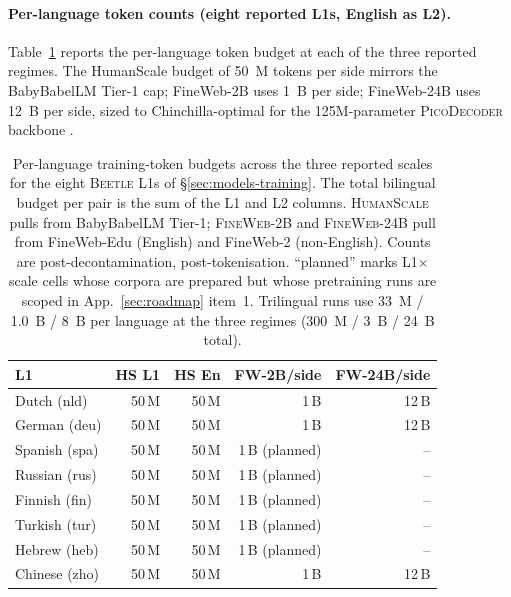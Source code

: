 \paragraph{Per-language token counts (eight reported L1s, English as L2).} Table~\ref{tab:beetle-data-tokens} reports the per-language token budget at each of the three reported regimes. The HumanScale budget of 50~M tokens per side mirrors the BabyBabelLM Tier-1 cap; FineWeb-2B uses 1~B per side; FineWeb-24B uses 12~B per side, sized to Chinchilla-optimal for the 125M-parameter \textsc{PicoDecoder} backbone \citep{hoffmann2022}.

\begin{table}[!ht]
\centering
\small
\caption{Per-language training-token budgets across the three reported scales for the eight \textsc{Beetle} L1s of \S\ref{sec:models-training}. The total bilingual budget per pair is the sum of the L1 and L2 columns. \textsc{HumanScale} pulls from BabyBabelLM Tier-1; \textsc{FineWeb-2B} and \textsc{FineWeb-24B} pull from FineWeb-Edu (English) and FineWeb-2 (non-English). Counts are post-decontamination, post-tokenisation. ``planned'' marks L1$\times$scale cells whose corpora are prepared but whose pretraining runs are scoped in App.~\ref{sec:roadmap} item~1. Trilingual runs use 33~M / 1.0~B / 8~B per language at the three regimes (300~M / 3~B / 24~B total).}
\label{tab:beetle-data-tokens}
\begin{tabular}{lrrrr}
\toprule
L1 & HS L1 & HS En & FW-2B/side & FW-24B/side \\
\midrule
Dutch (nld)      & 50\,M & 50\,M & 1\,B & 12\,B \\
German (deu)     & 50\,M & 50\,M & 1\,B & 12\,B \\
Spanish (spa)    & 50\,M & 50\,M & 1\,B (planned) & --   \\
Russian (rus)    & 50\,M & 50\,M & 1\,B (planned) & --   \\
Finnish (fin)    & 50\,M & 50\,M & 1\,B (planned) & --   \\
Turkish (tur)    & 50\,M & 50\,M & 1\,B (planned) & --   \\
Hebrew (heb)     & 50\,M & 50\,M & 1\,B (planned) & --   \\
Chinese (zho)    & 50\,M & 50\,M & 1\,B & 12\,B \\
\bottomrule
\end{tabular}
\end{table}


